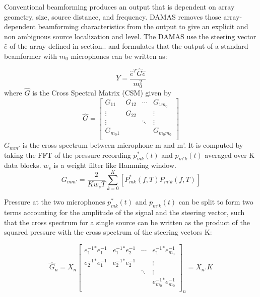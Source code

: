 Conventional beamforming produces an output that is dependent on array geometry, size, source distance, and frequency. DAMAS removes those array-dependent beamforming characteristics from the output to give an explicit and non ambiguous source localization and level. The DAMAS use the steering vector $\hat{e}$ of the array defined in section.. and formulates that the output of a standard beamformer with $m_{0}$ microphones can be written as:

\begin{equation}
    Y=\frac{\hat{e}^{T}\hat{G}\hat{e}}{m_0^2}
    \label{eq:DAMASoutputbeamformer}
\end{equation}
where $\hat{G}$ is the Cross Spectral Matrix (CSM) given by
\begin{equation}
\hat{G}=
    \begin{bmatrix} 
      G_{11} & G_{12} & \cdots & G_{1m_{0}}\\
      \vdots &  G_{22} &       &  \vdots\\
      \vdots &         & \ddots &  \vdots\\
      G_{m_{0}1} &     &       &  G_{m_{0}m_{0}}\\
    \end{bmatrix}  
\end{equation}
$G_{mm'}$ is the cross spectrum between microphone m  and m'. It is computed by taking the FFT of the pressure recording $p^{*}_{mk}(t)$ and $p_{m'k}(t)$ averaged over K data blocks. $w_{s}$ is a weight filter like Hamming window.
\begin{equation}
    G_{mm'}=\frac{2}{Kw_{s}T}\sum\limits_{k=0}^{K}[P^{*}_{mk}(f,T)P_{m'k}(f,T)]
\end{equation}

Pressure at the two microphones $p^{*}_{mk}(t)$ and $p_{m'k}(t)$ can be split to form two terms accounting for the amplitude of the signal and the steering vector, such that the cross spectrum for a single source can be written as the product of the squared pressure with the cross spectrum of the steering vectors K:

\begin{equation}
\hat{G}_{n}= X_{n} 
\begin{bmatrix} 
      e_{1}^{-1}^{*}e_{1}^{-1} & e_{1}^{-1}^{*}e_{2}^{-1} & \cdots &   e_{1}^{-1}^{*}e_{m_{0}}^{-1}\\
      e_{2}^{-1}^{*}e_{1}^{-1} & e_{2}^{-1}^{*}e_{2}^{-1} &       &  \vdots\\
         &     & \ddots &   \vdots\\
       &     &   &   e_{m_{0}}^{-1}^{*}e_{m_{0}}^{-1}\\
    \end{bmatrix}_{ n}= X_{n}.K 
\end{equation}   

